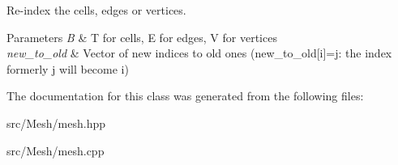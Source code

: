 Re-\/index the cells, edges or vertices. 


\begin{DoxyParams}{Parameters}
{\em B} & T for cells, E for edges, V for vertices \\
\hline
{\em new\+\_\+to\+\_\+old} & Vector of new indices to old ones (new\+\_\+to\+\_\+old\mbox{[}i\mbox{]}=j\+: the index formerly j will become i) \\
\hline
\end{DoxyParams}


The documentation for this class was generated from the following files\+:\begin{DoxyCompactItemize}
\item 
src/\+Mesh/mesh.\+hpp\item 
src/\+Mesh/mesh.\+cpp\end{DoxyCompactItemize}
